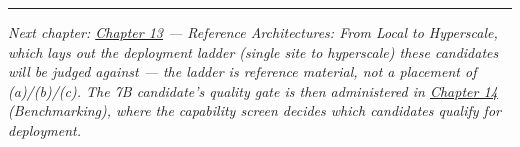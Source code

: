 \begin{center}\rule{0.5\linewidth}{0.5pt}\end{center}

\emph{Next chapter: \hyperref[chap:13]{Chapter 13} --- Reference Architectures: From Local
to Hyperscale, which lays out the deployment ladder (single site to
hyperscale) these candidates will be judged against --- the ladder is
reference material, not a placement of (a)/(b)/(c). The 7B candidate's
quality gate is then administered in \hyperref[chap:14]{Chapter 14} (Benchmarking), where
the capability screen decides which candidates qualify for deployment.}
